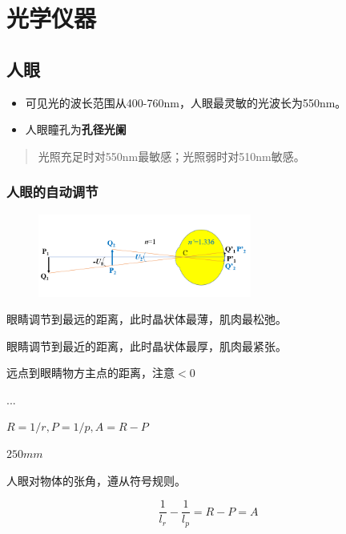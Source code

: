\section{光学仪器}
\subsection{人眼}
\begin{itemize}
\item 
可见光的波长范围从400-760nm，人眼最灵敏的光波长为550nm。
\item  人眼瞳孔为\textbf{孔径光阑}
\end{itemize}
\begin{quote}
{\qquad{}\ccwd\kaishu{}
光照充足时对550nm最敏感；光照弱时对510nm敏感。
}
\end{quote}
\subsubsection{人眼的自动调节}
\begin{figure}[H]
    \centering
    \includegraphics[width=7cm]{img/5.1.png}
    \end{figure}
\begin{description}[leftmargin=1.7cm,style=nextline,nosep]%
    \item[远点] 眼睛调节到最远的距离，此时晶状体最薄，肌肉最松弛。
    \item[近点]   眼睛调节到最近的距离，此时晶状体最厚，肌肉最紧张。
    \item[远点距 r]  远点到眼睛物方主点的距离，注意$<0$
    \item[近点距 p ] ...
    \item[屈光度]  $R=1 /r ,P=1 /p ,A=R-P$
    \item[明视距离] $250mm$ 
    \item[视角]  人眼对物体的张角，遵从符号规则。 

\end{description}
\begin{equation}
\frac{1}{l_r}-\frac{1}{l_p}=R-P=A
\end{equation}

